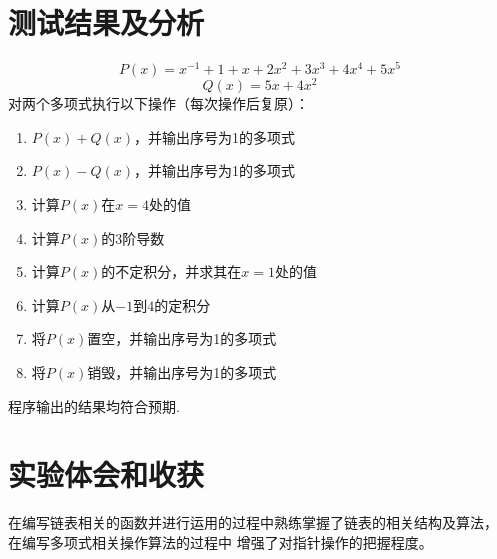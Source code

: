\documentclass[UTF8]{ctexart}
\begin{document}
\section{测试结果及分析}
\[P(x) = x^{-1} + 1 + x+2x^2+3x^3+4x^4+5x^5\]
\[Q(x) = 5x+4x^2\] 
对两个多项式执行以下操作（每次操作后复原）：
\begin{enumerate}
  \item $P(x)+Q(x)$，并输出序号为1的多项式
  \item $P(x)-Q(x)$，并输出序号为1的多项式
  \item 计算$P(x)$在$x=4$处的值
  \item 计算$P(x)$的3阶导数
  \item 计算$P(x)$的不定积分，并求其在$x=1$处的值
  \item 计算$P(x)$从$-1$到$4$的定积分
  \item 将$P(x)$置空，并输出序号为1的多项式
  \item 将$P(x)$销毁，并输出序号为1的多项式
\end{enumerate}
程序输出的结果均符合预期.
\section{实验体会和收获}
在编写链表相关的函数并进行运用的过程中熟练掌握了链表的相关结构及算法，
在编写多项式相关操作算法的过程中
增强了对指针操作的把握程度。
\end{document}

